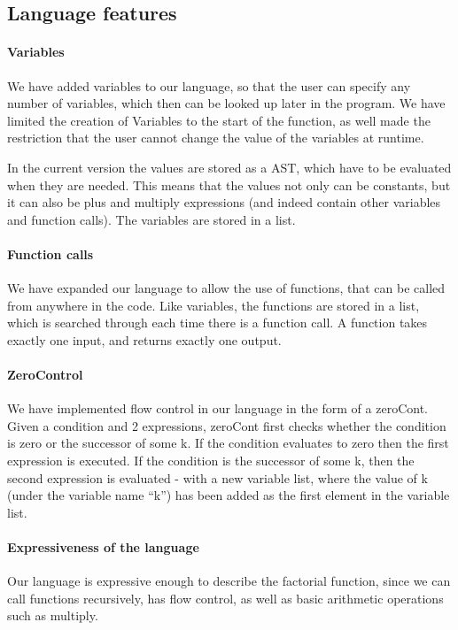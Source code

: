 \subsection{Language features}

\paragraph{Variables}
We have added variables to our language, so that the user can specify
any number of variables, which then can be looked up
later in the program. We have limited the creation of Variables to the
start of the function, as well made the restriction that the user
cannot change the value of the variables at runtime.

In the current version the values are stored as a AST, which have to be evaluated when they are needed. This means that
the values not only can be constants, but it can also be plus and
multiply expressions (and indeed contain other variables and function
calls). The variables are stored in a list.

\paragraph{Function calls}

We have expanded our language to allow the use of functions, that can
be called from anywhere in the code. Like variables, the functions are
stored in a list, which is searched through each time there is a
function call. A function takes exactly one input, and returns exactly
one output.

\paragraph{ZeroControl}
We have implemented flow control in our language in the form of a
zeroCont. Given a condition and 2 expressions, zeroCont first checks
whether the condition is zero or the successor of some k. If the
condition evaluates to zero then the first expression is executed. If
the condition is the successor of some k, then the second expression
is evaluated - with a new variable list, where the value of k (under
the variable name ``k'') has been added as the first element in the
variable list.

\paragraph{Expressiveness of the language}
Our language is expressive enough to describe the factorial function,
since we can call functions recursively, has flow control, as well as
basic arithmetic operations such as multiply.


